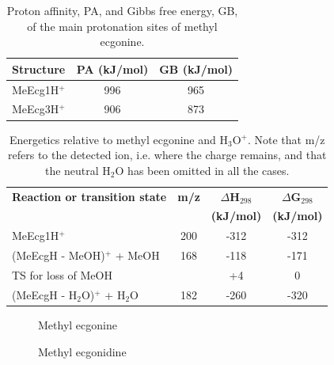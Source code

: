 \begin{table}%
\centering
\caption{Proton affinity, PA, and Gibbs free energy, GB, of the main protonation sites of methyl ecgonine.}
\label{tb:me1}
\begin{tabular}{lcc}
\toprule
\textbf{Structure} &\textbf{PA (kJ/mol)} &\textbf{GB (kJ/mol)}\\ \toprule
MeEcg1H$^+$  & 996 &   965    \\
MeEcg3H$^+$  & 906 &   873    \\
\bottomrule
\end{tabular}
\end{table}

\begin{table}%
\centering
\caption[Energetics relative to methyl ecgonine and H$_3$O$^+$.]{Energetics relative to methyl ecgonine and H$_3$O$^+$. Note that m/z refers to the detected ion, i.e. where the charge remains, and that the neutral H$_2$O has been omitted in all the cases.}
\label{tb:me2}
\begin{tabular}{lccc}
\toprule
\textbf{Reaction or transition state}	&\textbf{m/z} &\textbf{$\Delta$H$_{298}$} &\textbf{$\Delta$G$_{298}$}\\
& &	\textbf{(kJ/mol)} &\textbf{(kJ/mol)} \\  \toprule
MeEcg1H$^+$   				&	200	& -312  & -312   \\ \midrule
(MeEcgH - MeOH)$^+$ + MeOH	&	168	& -118  & -171   \\ \midrule
TS for loss of MeOH			&		& +4  	& 0   		\\ \midrule
(MeEcgH - H$_2$O)$^+$ + H$_2$O	&	182	& -260  & -320   \\ 
\bottomrule
\end{tabular}
\end{table}

\begin{figure}%
\centering
{}
\caption{Methyl ecgonine}\label{fig:me}
\end{figure}



\begin{figure}%
\centering
{}
\caption{Methyl ecgonidine}\label{fig:med}
\end{figure}



